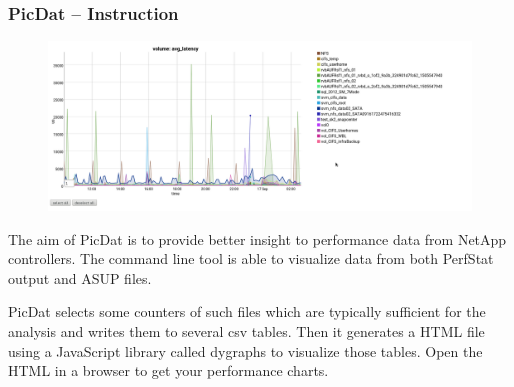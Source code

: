 \documentclass[8pt]{beamer}
\begin{document}
\begin{frame}
\frametitle{PicDat -- Instruction}
\begin{figure}
	\includegraphics[width=\textwidth]{../images/PicDat_normal.png}
\end{figure}
The aim of PicDat is to provide better insight to performance data from NetApp controllers. The command line tool is able to visualize data from both PerfStat output and ASUP files.

PicDat selects some counters of such files which are typically sufficient for the analysis and writes them to several csv tables. Then it generates a HTML file using a JavaScript library called dygraphs to visualize those tables. Open the HTML in a browser to get your performance charts.
\end{frame}
\end{document}
